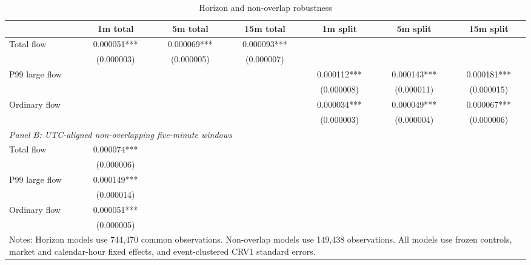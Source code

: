 \begin{table}[htbp]
\centering
\caption{Horizon and non-overlap robustness}
\label{tab:match-horizons}
\scriptsize
\begin{tabular}{lcccccc}
\hline
 & 1m total & 5m total & 15m total & 1m split & 5m split & 15m split \\
\hline
Total flow & 0.000051*** & 0.000069*** & 0.000093*** &  &  &  \\
 & (0.000003) & (0.000005) & (0.000007) &  &  &  \\
P99 large flow &  &  &  & 0.000112*** & 0.000143*** & 0.000181*** \\
 &  &  &  & (0.000008) & (0.000011) & (0.000015) \\
Ordinary flow &  &  &  & 0.000034*** & 0.000049*** & 0.000067*** \\
 &  &  &  & (0.000003) & (0.000004) & (0.000006) \\
\hline
\multicolumn{7}{l}{\textit{Panel B: UTC-aligned non-overlapping five-minute windows}} \\
Total flow & 0.000074*** & & & & & \\
 & (0.000006) & & & & & \\
P99 large flow & 0.000149*** & & & & & \\
 & (0.000014) & & & & & \\
Ordinary flow & 0.000051*** & & & & & \\
 & (0.000005) & & & & & \\
\hline
\multicolumn{7}{p{0.96\textwidth}}{\footnotesize Notes: Horizon models use 744,470 common observations. Non-overlap models use 149,438 observations. All models use frozen controls, market and calendar-hour fixed effects, and event-clustered CRV1 standard errors.}
\end{tabular}
\end{table}
